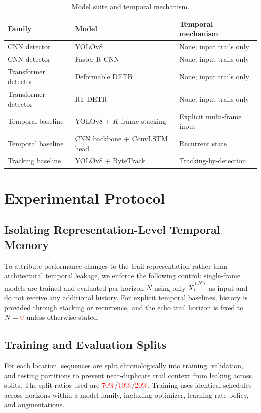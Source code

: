\documentclass[twocolumn, 10pt]{article}
\newcommand{\ph}[1]{\textcolor{red}{#1}}
\begin{document}
\begin{table}[t]
\centering
\caption{Model suite and temporal mechanism.}
\label{tab:models}
\begin{tabular}{@{}p{20mm}p{34mm}p{23mm}@{}}
\toprule
\textbf{Family} & \textbf{Model} & \textbf{Temporal mechanism} \\
\midrule
CNN detector & YOLOv8 \cite{UltralyticsYOLOv8Docs} & None; input trails only \\
CNN detector & Faster R-CNN \cite{Ren2015FasterRCNN} & None; input trails only \\
Transformer detector & Deformable DETR \cite{Zhu2021DeformableDETR} & None; input trails only \\
Transformer detector & RT-DETR \cite{Zhao2023RTDETR} & None; input trails only \\
Temporal baseline & YOLOv8 + $K$-frame stacking & Explicit multi-frame input \\
Temporal baseline & CNN backbone + ConvLSTM head & Recurrent state \\
Tracking baseline & YOLOv8 + ByteTrack \cite{Zhang2022ByteTrack} & Tracking-by-detection \\
\bottomrule
\end{tabular}
\end{table}

\section{Experimental Protocol}
\subsection{Isolating Representation-Level Temporal Memory}
To attribute performance changes to the trail representation rather than architectural temporal leakage, we enforce the following control: single-frame models are trained and evaluated per horizon $N$ using only $\tilde{X}_t^{(N)}$ as input and do not receive any additional history. For explicit temporal baselines, history is provided through stacking or recurrence, and the echo trail horizon is fixed to $N=\ph{0}$ unless otherwise stated.

\subsection{Training and Evaluation Splits}
For each location, sequences are split chronologically into training, validation, and testing partitions to prevent near-duplicate trail context from leaking across splits. The split ratios used are \ph{70\%}/\ph{10\%}/\ph{20\%}. Training uses identical schedules across horizons within a model family, including optimizer, learning rate policy, and augmentations.
\end{document}
